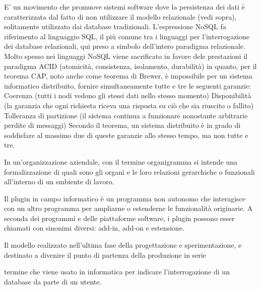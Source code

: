 \documentclass{scalatekids-article}
\begin{document}
   E' un movimento che promuove sistemi software dove la persistenza dei dati è caratterizzata dal fatto di non utilizzare il modello relazionale (vedi sopra), solitamente utilizzato dai database tradizionali.
  L'espressione NoSQL fa riferimento al linguaggio SQL, il più comune tra i linguaggi per l'interrogazione dei database relazionali, qui preso a simbolo dell'intero paradigma relazionale. Molto spesso nei linguaggi NoSQL viene sacrificato in favore dele prestazioni il paradigma ACID (atomicità, consistenza, isolamento, durabilità) in quanto, per il teorema CAP, noto anche come teorema di Brewer, è impossibile per un sistema informatico distribuito, fornire simultaneamente tutte e tre le seguenti garanzie:
  Coerenza (tutti i nodi vedono gli stessi dati nello stesso momento)
  Disponibilità (la garanzia che ogni richiesta riceva una risposta su ciò che sia riuscito o fallito)
  Tolleranza di partizione (il sistema continua a funzionare nonostante arbitrarie perdite di messaggi)
  Secondo il teorema, un sistema distribuito è in grado di soddisfare al massimo due di queste garanzie allo stesso tempo, ma non tutte e tre.


   In un'organizzazione aziendale, con il termine organigramma si intende una formalizzazione di quali sono gli organi e le loro relazioni gerarchiche o funzionali all'interno di un smbiente di lavoro.



   Il plugin in campo informatico è un programma non autonomo che interagisce con un altro programma per ampliarne o estenderne le funzionalità originarie.
  A seconda dei programmi e delle piattaforme software, i plugin possono esser chiamati con sinonimi diversi: add-in, add-on e estensione.

   Il modello realizzato nell’ultima fase della progettazione e sperimentazione, e destinato a divenire il punto di partenza della produzione in serie




   termine che viene usato in informatica per indicare l'interrogazione di un database da parte di un utente.

\end{document}
